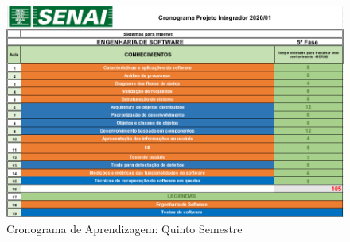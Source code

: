 \begin{figure}[htb]
	\caption{\label{cron-4-semestre}Cronograma de Aprendizagem: Quinto Semestre}
	\begin{center}
		\includegraphics[scale=0.70]{./Figuras/cronograma-5-semestre.png}
	\end{center}
\end{figure}


